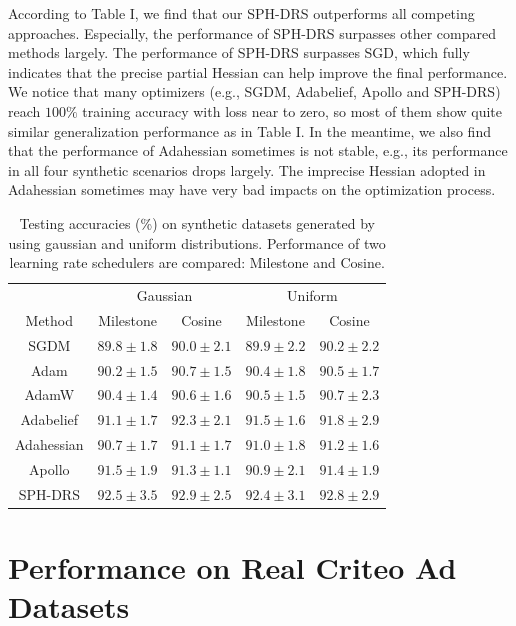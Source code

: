 \documentclass[conference]{IEEEtran}
\begin{document}
According to Table I, we find that our SPH-DRS outperforms all competing approaches. Especially, the performance of SPH-DRS surpasses other compared methods largely. The performance of SPH-DRS surpasses SGD, which fully indicates that the precise partial Hessian can help improve the final performance. We notice that many optimizers (e.g., SGDM, Adabelief, Apollo and SPH-DRS) reach $100 \%$ training accuracy with loss near to zero, so most of them show quite similar generalization performance as in Table I. In the meantime, we also find that the performance of Adahessian sometimes is not stable, e.g., its performance in all four synthetic scenarios drops largely. The imprecise Hessian adopted in Adahessian sometimes may have very bad impacts on the optimization process.

\begin{table}[!h]
\centering
\begin{tabular}{ccccc}
\hline
 & \multicolumn{2}{c}{Gaussian} & \multicolumn{2}{c}{Uniform} \\
Method & Milestone & Cosine & Milestone & Cosine \\
\hline
SGDM & $89.8 \pm 1.8$ & $90.0 \pm 2.1$ & $89.9 \pm 2.2$ & $90.2 \pm 2.2$ \\
Adam & $90.2 \pm 1.5$ & $90.7 \pm 1.5$ & $90.4 \pm 1.8$ & $90.5 \pm 1.7$ \\
AdamW & $90.4 \pm 1.4$ & $90.6 \pm 1.6$ & $90.5 \pm 1.5$ & $90.7 \pm 2.3$ \\
Adabelief & $91.1 \pm 1.7$ & $92.3 \pm 2.1$ & $91.5 \pm 1.6$ & $91.8 \pm 2.9$ \\
Adahessian & $90.7 \pm 1.7$ & $91.1 \pm 1.7$ & $91.0 \pm 1.8$ & $91.2 \pm 1.6$ \\
Apollo & $91.5 \pm 1.9$ & $91.3 \pm 1.1$ & $90.9 \pm 2.1$ & $91.4 \pm 1.9$ \\
SPH-DRS & $92.5 \pm 3.5$ & $92.9 \pm 2.5$ & $92.4 \pm 3.1$ & $92.8 \pm 2.9$ \\
\hline
\end{tabular}
\caption{Testing accuracies (\%) on synthetic datasets generated by using gaussian and uniform distributions. Performance of two learning rate schedulers are compared: Milestone and Cosine.}
\end{table}

\section{Performance on Real Criteo Ad Datasets}
\end{document}
